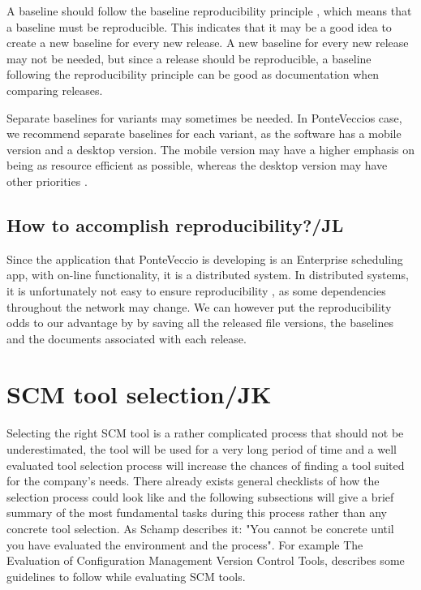 \documentclass[10pt]{article}
\begin{document}
\noindent A baseline should follow the baseline reproducibility principle \cite{Appleton2}, which means that a baseline must be reproducible. This indicates that it may be a good idea to create a new baseline for every new release. A new baseline for every new release may not be needed, but since a release should be reproducible, a baseline following the reproducibility principle can be good as documentation when comparing releases.

\noindent Separate baselines for variants may sometimes be needed. In PonteVeccios case, we recommend separate baselines for each variant, as the software has a mobile version and a desktop version. The mobile version may have a higher emphasis on being as resource efficient as possible, whereas the desktop version may have other priorities \cite{Nielsen}.

\subsection{How to accomplish reproducibility?/JL}
\noindent Since the application that PonteVeccio is developing is an Enterprise scheduling app, with on-line functionality, it is a distributed system. In distributed systems, it is unfortunately not easy to ensure reproducibility \cite{Bays}, as some dependencies throughout the network may change. We can however put the reproducibility odds to our advantage by by saving all the released file versions, the baselines and the documents associated with each release. 

\section{SCM tool selection/JK}
Selecting the right SCM tool is a rather complicated process that should not be underestimated, the tool will be used for a very long period of time and a well evaluated tool selection process will increase the chances of finding a tool suited for the company's needs. There already exists general checklists of how the selection process could look like and the following subsections will give a brief summary of the most fundamental tasks during this process rather than any concrete tool selection. As Schamp describes it\cite{Schamp}:
"You cannot be concrete until you have evaluated the environment and the process". For example The Evaluation of Configuration Management Version Control Tools, \cite{ABB} describes some guidelines to follow while evaluating SCM tools.
\end{document}
